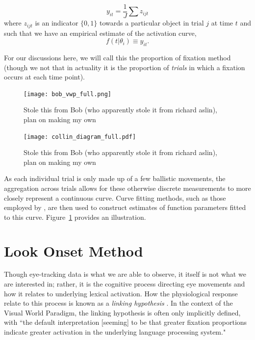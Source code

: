\begin{equation}\label{eq:sum_proportions}
y_{it} = \frac1J \sum z_{ijt}
\end{equation}
where $z_{ijt}$ is an indicator $\{0, 1\}$  towards a particular object in trial $j$ at time $t$ and such that we have an empirical estimate of the activation curve,
\begin{equation}\label{eq:empir_to_activation}
f(t | \theta_i) \equiv y_{it}.
\end{equation}



For our discussions here, we will call this the proportion of fixation method (though we not that in actuality it is the proportion of \textit{trials} in which a fixation occurs at each time point).


\begin{figure}[H]
\centering
\texttt{[image: bob\_vwp\_full.png]}
\caption{Stole this from Bob (who apparently stole it from richard aslin), plan on making my own}
\label{fig:bob_diagram_full}
\end{figure}

\begin{figure}[H]
\centering
\texttt{[image: collin\_diagram\_full.pdf]}
\caption{Stole this from Bob (who apparently stole it from richard aslin), plan on making my own}
\label{fig:collin_diagram_full}
\end{figure}



As each individual trial is only made up of a few ballistic movements, the aggregation across trials allows for these otherwise discrete measurements to more closely represent a continuous curve. Curve fitting methods, such as those employed by , are then used to construct estimates of function parameters fitted to this curve. Figure~\ref{fig:bob_diagram_full} provides an illustration.


\section{Look Onset Method}

Though eye-tracking data is what we are able to observe, it itself is not what we are interested in; rather, it is the cognitive process directing eye movements and how it relates to underlying lexical activation. How the physiological response relate to this process is known as a \textit{linking hypothesis} \cite{Magnuson2019}. In the context of the Visual World Paradigm, the linking hypothesis is often only implicitly defined, with ``the default interpretation [seeming] to be that greater fixation proportions indicate greater activation in the underlying language processing system." 

